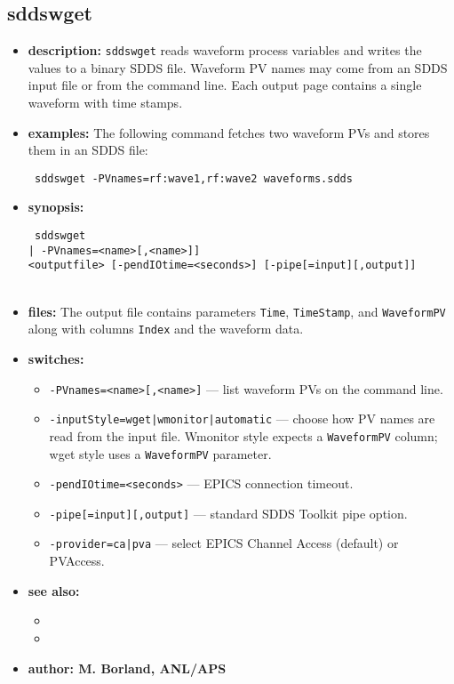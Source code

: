 \begin{latexonly}
\newpage
\end{latexonly}

\subsection{sddswget}
\label{sddswget}

\begin{itemize}
\item {\bf description:}
  \verb+sddswget+ reads waveform process variables and writes the values to a binary SDDS file.  Waveform PV names may come from an SDDS input file or from the command line.  Each output page contains a single waveform with time stamps.

\item {\bf examples:}
  The following command fetches two waveform PVs and stores them in an SDDS file:
  \begin{flushleft}{\tt
  sddswget -PVnames=rf:wave1,rf:wave2 waveforms.sdds
  }\end{flushleft}

\item {\bf synopsis:}
  \begin{flushleft}{\tt
  sddswget\\
      [<inputfile> [-inputStyle={wget|wmonitor|automatic}] | -PVnames=<name>[,<name>]]\\
      <outputfile> [-pendIOtime=<seconds>] [-pipe[=input][,output]]\\
      [-provider={ca|pva}]\\
  }\end{flushleft}

\item {\bf files:}
  The output file contains parameters \verb+Time+, \verb+TimeStamp+, and \verb+WaveformPV+ along with columns \verb+Index+ and the waveform data.

\item {\bf switches:}
  \begin{itemize}
    \item {\tt -PVnames=<name>[,<name>]} --- list waveform PVs on the command line.
    \item {\tt -inputStyle={wget|wmonitor|automatic}} --- choose how PV names are read from the input file.  Wmonitor style expects a \verb+WaveformPV+ column; wget style uses a \verb+WaveformPV+ parameter.
    \item {\tt -pendIOtime=<seconds>} --- EPICS connection timeout.
    \item {\tt -pipe[=input][,output]} --- standard SDDS Toolkit pipe option.
    \item {\tt -provider={ca|pva}} --- select EPICS Channel Access (default) or PVAccess.
  \end{itemize}

\item {\bf see also:}
  \begin{itemize}
    \item {}
    \item {}
  \end{itemize}

\item {\bf author: M. Borland, ANL/APS}
\end{itemize}
